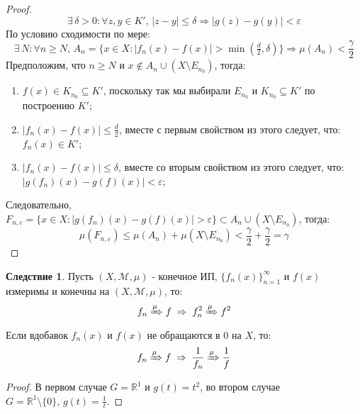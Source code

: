 \documentclass[12pt]{article}
\newcommand{\MR}{\mathbb{R}}
\newcommand{\MM}{\mathcal{M}}
\newcommand{\VE}{\varepsilon}
\theoremstyle{definition}
\newtheorem{corollary}{Следствие}
\begin{document}
\begin{proof}
	$$
		\exists\, \delta > 0 \colon \forall z,y \in K', \, |z - y| \leq \delta \Rightarrow |g(z) - g(y)| < \VE
	$$
	По условию сходимости по мере:
	$$
		\exists \, N \colon \forall n \geq N, \, A_n = \{x \in X \colon |f_n(x) - f(x)| > \min(\tfrac{d}{2}, \delta)\} \Rightarrow \mu(A_n) < \dfrac{\gamma}{2}
	$$
	Предположим, что $n \geq N$ и $x \not\in A_n \cup (X \setminus E_{n_0})$, тогда:
	\begin{enumerate}[label=\arabic*)]
		\item $f(x) \in K_{n_0} \subseteq K'$, поскольку так мы выбирали $E_{n_0}$ и $K_{n_0} \subseteq K'$ по построению $K'$;
		\item $|f_n(x) - f(x)| \leq \tfrac{d}{2}$, вместе с первым свойством из этого следует, что: $f_n(x) \in K'$;
		\item $|f_n(x) - f(x)| \leq \delta$, вместе со вторым свойством из этого следует, что: $|g(f_n)(x) - g(f)(x)| < \VE$;
	\end{enumerate}
	Следовательно, $F_{n,\VE} = \{x \in X \colon |g(f_n)(x) - g(f)(x)| > \VE\} \subset A_n \cup (X \setminus E_{n_0})$, тогда:
	$$
		\mu(F_{n,\VE}) \leq \mu(A_n) + \mu(X \setminus E_{n_0}) < \dfrac{\gamma}{2} + \dfrac{\gamma}{2} = \gamma
	$$ 
\end{proof}
\begin{corollary}
	Пусть $(X,\MM,\mu)$ - конечное ИП, $\{f_n(x)\}_{n = 1}^{\infty}$ и $f(x)$ измеримы и конечны на $(X, \MM,\mu)$, то: 
	$$
		f_n \xRightarrow{\mu} f \; \Rightarrow \; f_n^2 \xRightarrow{\mu} f^2
	$$
	Если вдобавок $f_n(x)$ и $f(x)$ не обращаются в $0$ на $X$, то: 
	$$
		f_n \xRightarrow{\mu} f \; \Rightarrow \; \dfrac{1}{f_n} \xRightarrow{\mu}\dfrac{1}{f}
	$$
\end{corollary}
\begin{proof}
	В первом случае $G = \MR^1$ и $g(t) = t^2$, во втором случае $G = \MR^1 \setminus \{0\}, \, g(t) = \tfrac{1}{t}$.
\end{proof}
\end{document}
